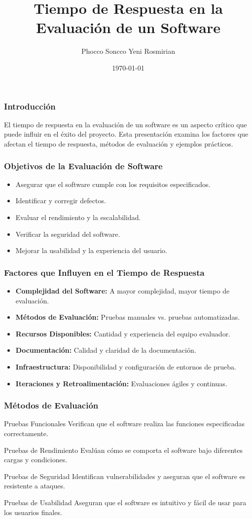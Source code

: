 \documentclass{beamer}
\title{Tiempo de Respuesta en la Evaluación de un Software}
\author{Phocco Soncco Yeni Rosmirian}
\date{\today}
\begin{document}
\frame{\titlepage}

\begin{frame}
\frametitle{Introducción}
El tiempo de respuesta en la evaluación de un software es un aspecto crítico que puede influir en el éxito del proyecto. Esta presentación examina los factores que afectan el tiempo de respuesta, métodos de evaluación y ejemplos prácticos.
\end{frame}

\begin{frame}
\frametitle{Objetivos de la Evaluación de Software}
\begin{itemize}
    \item Asegurar que el software cumple con los requisitos especificados.
    \item Identificar y corregir defectos.
    \item Evaluar el rendimiento y la escalabilidad.
    \item Verificar la seguridad del software.
    \item Mejorar la usabilidad y la experiencia del usuario.
\end{itemize}
\end{frame}

\begin{frame}
\frametitle{Factores que Influyen en el Tiempo de Respuesta}
\begin{itemize}
    \item \textbf{Complejidad del Software:} A mayor complejidad, mayor tiempo de evaluación.
    \item \textbf{Métodos de Evaluación:} Pruebas manuales vs. pruebas automatizadas.
    \item \textbf{Recursos Disponibles:} Cantidad y experiencia del equipo evaluador.
    \item \textbf{Documentación:} Calidad y claridad de la documentación.
    \item \textbf{Infraestructura:} Disponibilidad y configuración de entornos de prueba.
    \item \textbf{Iteraciones y Retroalimentación:} Evaluaciones ágiles y continuas.
\end{itemize}
\end{frame}

\begin{frame}
\frametitle{Métodos de Evaluación}
\begin{block}{Pruebas Funcionales}
Verifican que el software realiza las funciones especificadas correctamente.
\end{block}
\begin{block}{Pruebas de Rendimiento}
Evalúan cómo se comporta el software bajo diferentes cargas y condiciones.
\end{block}
\begin{block}{Pruebas de Seguridad}
Identifican vulnerabilidades y aseguran que el software es resistente a ataques.
\end{block}
\begin{block}{Pruebas de Usabilidad}
Aseguran que el software es intuitivo y fácil de usar para los usuarios finales.
\end{block}
\end{frame}
\end{document}
